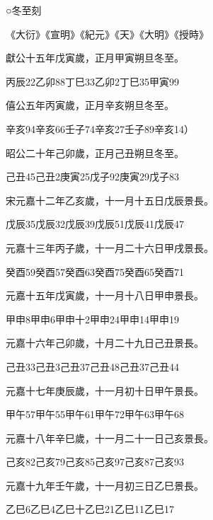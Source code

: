\begin{pinyinscope}
 ○冬至刻



 《大衍》《宣明》《紀元》《天》《大明》《授時》



 獻公十五年戊寅歲，正月甲寅朔旦冬至。



 丙辰22乙卯88丁巳33乙卯2丁巳35甲寅99



 僖公五年丙寅歲，正月辛亥朔旦冬至。



 辛亥94辛亥66壬子74辛亥27壬子89辛亥14）



 昭公二十年己卯歲，正月己丑朔旦冬至。



 己丑45己丑2庚寅25戊子92庚寅29戊子83



 宋元嘉十二年乙亥歲，十一月十五日戊辰景長。



 戊辰35戊辰32戊辰39戊辰51戊辰41戊辰47



 元嘉十三年丙子歲，十一月二十六日甲戌景長。



 癸酉59癸酉57癸酉63癸酉75癸酉65癸酉71



 元嘉十五年戊寅歲，十一月十八日甲申景長。



 甲申8甲申6甲申十2甲申24甲申14甲申19



 元嘉十六年己卯歲，十月二十九日己丑景長。



 己丑33己丑3己丑37己丑48己丑37己丑44



 元嘉十七年庚辰歲，十一月初十日甲午景長。



 甲午57甲午55甲午61甲午72甲午63甲午68



 元嘉十八年辛巳歲，十一月二十一日己亥景長。



 己亥82己亥79己亥85己亥97己亥87己亥93



 元嘉十九年壬午歲，十一月初三日乙巳景長。



 乙巳6乙巳4乙巳十乙巳21乙巳11乙巳17




\end{pinyinscope}
